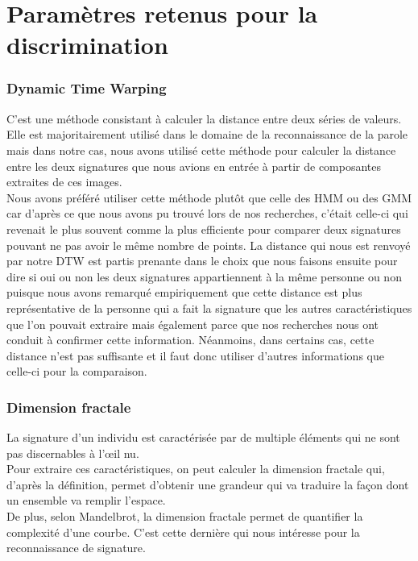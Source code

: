 \documentclass[fontsize=12pt, twoside=no]{scrartcl} %
\begin{document}
\part{Paramètres retenus pour la discrimination}

\section{Dynamic Time Warping}

C'est une méthode consistant à calculer la distance entre deux séries de valeurs. Elle est majoritairement utilisé dans le domaine de la reconnaissance de la parole mais dans notre cas, nous avons utilisé cette méthode pour calculer la distance entre les deux signatures que nous avions en entrée à partir de composantes extraites de ces images. \\

Nous avons préféré utiliser cette méthode plutôt que celle des HMM ou des GMM car d'après ce que nous avons pu trouvé lors de nos recherches, c'était celle-ci qui revenait le plus souvent comme la plus efficiente pour comparer deux signatures pouvant ne pas avoir le même nombre de points. La distance qui nous est renvoyé par notre DTW est partis prenante dans le choix que nous faisons ensuite pour dire si oui ou non les deux signatures appartiennent à la même personne ou non puisque nous avons remarqué empiriquement que cette distance est plus représentative de la personne qui a fait la signature que les autres caractéristiques que l'on pouvait extraire mais également parce que nos recherches nous ont conduit à confirmer cette information. Néanmoins, dans certains cas, cette distance n'est pas suffisante et il faut donc utiliser d'autres informations que celle-ci pour la comparaison.

\section{Dimension fractale}
La signature d'un individu est caractérisée par de multiple éléments qui ne sont pas discernables à l'œil nu.\\

Pour extraire ces caractéristiques, on peut calculer la dimension fractale qui, d'après la définition, permet d'obtenir une grandeur qui va traduire la façon dont un ensemble va remplir l'espace.\\

De plus, selon Mandelbrot, la dimension fractale permet de quantifier la complexité d'une courbe. C'est cette dernière qui nous intéresse pour la reconnaissance de signature.\\
\end{document}
